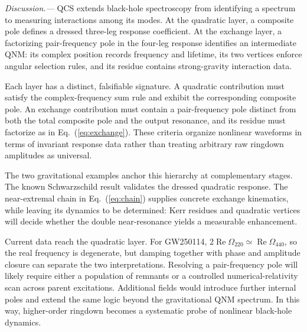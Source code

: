 \documentclass[
 reprint,
 amsmath,amssymb,
 aps,
 prl,
 superscriptaddress,
 nofootinbib
]{revtex4-2}
\newcommand{\Om}{\Omega}
\begin{document}
\textit{Discussion.---}
QCS extends black-hole spectroscopy from identifying a spectrum to measuring
interactions among its modes. At the quadratic layer, a composite pole defines
a dressed three-leg response coefficient. At the exchange layer, a
factorizing pair-frequency pole in the four-leg response identifies an
intermediate QNM: its complex position records frequency and lifetime, its two
vertices enforce angular selection rules, and its residue contains
strong-gravity interaction data.

Each layer has a distinct, falsifiable signature. A quadratic contribution
must satisfy the complex-frequency sum rule and exhibit the corresponding
composite pole. An exchange contribution must contain a
pair-frequency pole distinct from both the total composite pole and the output
resonance, and its residue must factorize as in Eq.~(\ref{eq:exchange}). These
criteria organize nonlinear waveforms in terms of invariant response data
rather than treating arbitrary raw ringdown amplitudes as universal.

The two gravitational examples anchor this hierarchy at complementary stages.
The known Schwarzschild result validates the dressed quadratic response.
The near-extremal chain in Eq.~(\ref{eq:chain}) supplies concrete exchange
kinematics, while leaving its dynamics to be determined: Kerr residues and
quadratic vertices will decide whether the double near-resonance yields a
measurable enhancement.

Current data reach the quadratic layer. For GW250114,
\(2\operatorname{Re}\Om_{220}\simeq\operatorname{Re}\Om_{440}\), so the real
frequency is degenerate, but damping together with phase and amplitude closure
can separate the two interpretations. Resolving a pair-frequency pole will
likely require either a population of remnants or a controlled
numerical-relativity scan across parent excitations. Additional fields would
introduce further internal poles and extend the same logic beyond the
gravitational QNM spectrum. In this way, higher-order ringdown becomes a
systematic probe of nonlinear black-hole dynamics.


\end{document}
